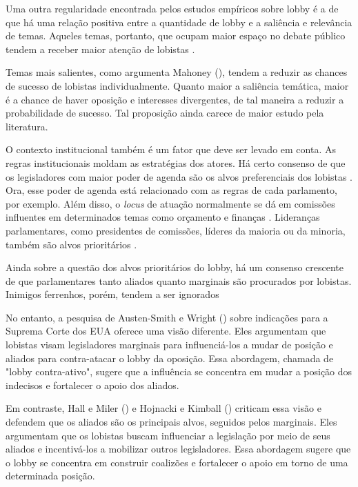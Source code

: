 Uma outra regularidade encontrada pelos estudos empíricos sobre lobby é a de que há uma relação positiva entre a quantidade de lobby e a saliência e relevância de temas. Aqueles temas, portanto, que ocupam maior espaço no debate público tendem a receber maior atenção de lobistas \cite{caldeira2000lobbying,  baumgartner2010agendas, bonardi2005corporate}.

Temas mais salientes, como argumenta Mahoney (\citeyear{mahoney_lobbying_2007}), tendem a reduzir as chances de sucesso de lobistas individualmente. Quanto maior a saliência temática, maior é a chance de haver oposição e interesses divergentes, de tal maneira a reduzir a probabilidade de sucesso. Tal proposição ainda carece de maior estudo pela literatura.

O contexto institucional também é um fator que deve ser levado em conta. As regras institucionais moldam as estratégias dos atores. Há certo consenso de que os legisladores com maior poder de agenda são os alvos preferenciais dos lobistas \cite{de_figueiredo_advancing_2014}. Ora, esse poder de agenda está relacionado com as regras de cada parlamento, por exemplo. Além disso, o \textit{locus} de atuação normalmente se dá em comissões influentes em determinados temas como orçamento e finanças \cite{hojnacki2001pac, drope2004purchasing}. Lideranças parlamentares, como presidentes de comissões, líderes da maioria ou da minoria, também são alvos prioritários \cite{evans1996before}.

Ainda sobre a questão dos alvos prioritários do lobby, há um consenso crescente de que parlamentares tanto aliados \cite{kollman1998outside, caldeira2000lobbying, hojnacki2001pac} quanto marginais \cite{holyoke2003choosing, kelleher2009political, bertrand2014whom, gawande2012lobbying} são procurados por lobistas. Inimigos ferrenhos, porém, tendem a ser ignorados  \cite{de_figueiredo_advancing_2014}

No entanto, a pesquisa de Austen-Smith e Wright (\citeyear{austen1996theory}) sobre indicações para a Suprema Corte dos EUA oferece uma visão diferente. Eles argumentam que lobistas visam legisladores marginais para influenciá-los a mudar de posição e aliados para contra-atacar o lobby da oposição. Essa abordagem, chamada de "lobby contra-ativo", sugere que a influência se concentra em mudar a posição dos indecisos e fortalecer o apoio dos aliados.

Em contraste, Hall e Miler (\citeyear{Hall2006}) e Hojnacki e Kimball (\citeyear{hojnacki2001pac}) criticam essa visão e defendem que os aliados são os principais alvos, seguidos pelos marginais. Eles argumentam que os lobistas buscam influenciar a legislação por meio de seus aliados e incentivá-los a mobilizar outros legisladores. Essa abordagem sugere que o lobby se concentra em construir coalizões e fortalecer o apoio em torno de uma determinada posição.


